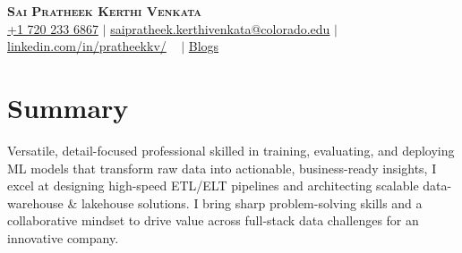\documentclass[letterpaper,10pt]{article}
\begin{document}

\begin{center}
    \textbf{\Large \scshape Sai Pratheek Kerthi Venkata} \\ \vspace{3pt}
    \small
    \faMobile \hspace{.5pt} \href{tel:+17202336867}{+1 720 233 6867}
    $|$
    \faAt \hspace{.5pt} \href{mailto:saipratheek.kerthivenkata@colorado.edu}{saipratheek.kerthivenkata@colorado.edu}
    $|$
    \faLinkedinSquare \hspace{.5pt} \href{https://www.linkedin.com/in/pratheekkv/}{linkedin.com/in/pratheekkv/}
    \
    $|$
    \faRssSquare \hspace{.5pt}
    \href{https://www.cloudthat.com/resources/author/sai-pratheek/}{Blogs}
\end{center}
\vspace{-22pt}


\section{Summary}

Versatile, detail-focused professional skilled in training, evaluating, and deploying ML models that transform raw data into actionable, business-ready insights, I excel at designing high-speed ETL/ELT pipelines and architecting scalable data-warehouse \& lakehouse solutions. I bring sharp problem-solving skills and a collaborative mindset to drive value across full-stack data challenges for an innovative company.

\vspace{-10pt}
\fontsize{9}{10}\selectfont
\end{document}
